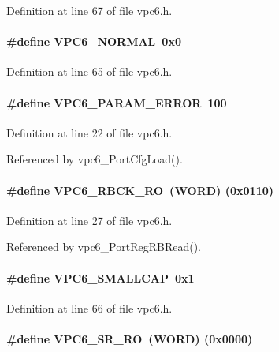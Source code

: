 Definition at line 67 of file vpc6.h.
\paragraph[{VPC6\_\-NORMAL}]{\setlength{\rightskip}{0pt plus 5cm}\#define VPC6\_\-NORMAL~0x0}\hfill\label{vpc6_8h_a7711574cd4c5c084200c9cf7bf466eb4}


Definition at line 65 of file vpc6.h.
\paragraph[{VPC6\_\-PARAM\_\-ERROR}]{\setlength{\rightskip}{0pt plus 5cm}\#define VPC6\_\-PARAM\_\-ERROR~100}\hfill\label{vpc6_8h_af74eeb475525d1875a9675709fe0f5a7}


Definition at line 22 of file vpc6.h.

Referenced by vpc6\_\-PortCfgLoad().
\paragraph[{VPC6\_\-RBCK\_\-RO}]{\setlength{\rightskip}{0pt plus 5cm}\#define VPC6\_\-RBCK\_\-RO~({\bf WORD}) (0x0110)}\hfill\label{vpc6_8h_ad05e74acd196318a563295b0784e3fa4}


Definition at line 27 of file vpc6.h.

Referenced by vpc6\_\-PortRegRBRead().
\paragraph[{VPC6\_\-SMALLCAP}]{\setlength{\rightskip}{0pt plus 5cm}\#define VPC6\_\-SMALLCAP~0x1}\hfill\label{vpc6_8h_a3543dbd05552b87204f1e7b65aa8fdd9}


Definition at line 66 of file vpc6.h.
\paragraph[{VPC6\_\-SR\_\-RO}]{\setlength{\rightskip}{0pt plus 5cm}\#define VPC6\_\-SR\_\-RO~({\bf WORD}) (0x0000)}\hfill\label{vpc6_8h_a37c74185bb57b4d8b63f595031f085db}


